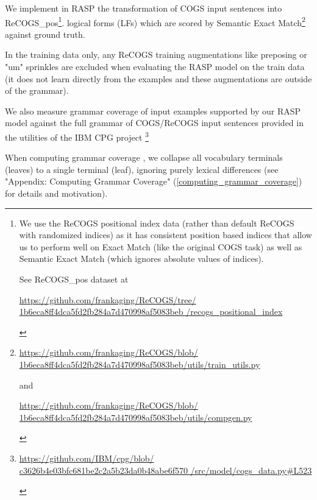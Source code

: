 \documentclass[11pt]{article}
\begin{document}
We implement in RASP the transformation of COGS input sentences into ReCOGS\_pos\footnote{
\begin{footnotesize}We use the ReCOGS positional index data (rather than default ReCOGS with randomized indices) as it has consistent position based indices that allow us to perform well on Exact Match (like the original COGS task) as well as Semantic Exact Match (which ignores absolute values of indices).

See ReCOGS\_pos dataset at 

\href{https://github.com/frankaging/ReCOGS/tree/1b6eca8ff4dca5fd2fb284a7d470998af5083beb/recogs\_positional\_index}{https://github.com/frankaging/ReCOGS/tree/
1b6eca8ff4dca5fd2fb284a7d470998af5083beb
/recogs\_positional\_index}
\end{footnotesize}
}. logical forms (LFs) which are scored by Semantic Exact Match\footnote{
\begin{footnotesize}\href{https://github.com/frankaging/ReCOGS/blob/1b6eca8ff4dca5fd2fb284a7d470998af5083beb/utils/train\_utils.py}{https://github.com/frankaging/ReCOGS/blob/
1b6eca8ff4dca5fd2fb284a7d470998af5083beb/utils/train\_utils.py}

and

\href{https://github.com/frankaging/ReCOGS/blob/1b6eca8ff4dca5fd2fb284a7d470998af5083beb/utils/compgen.py}{https://github.com/frankaging/ReCOGS/blob/
1b6eca8ff4dca5fd2fb284a7d470998af5083beb/utils/compgen.py}
\end{footnotesize}
} against ground truth.

In the training data only, any ReCOGS training augmentations like preposing or "um" sprinkles are excluded when evaluating the RASP model on the train data (it does not learn directly from the examples and these augmentations are outside of the grammar). 

We also measure grammar coverage of input examples supported by our RASP model against the full grammar of COGS/ReCOGS input sentences provided in the utilities of the IBM CPG project \citep{klinger2024compositionalprogramgenerationfewshot}\footnote{\begin{footnotesize}\href{https://github.com/IBM/cpg/blob/c3626b4e03bfc681be2c2a5b23da0b48abe6f570/src/model/cogs\_data.py\#L523}{https://github.com/IBM/cpg/blob/
c3626b4e03bfc681be2c2a5b23da0b48abe6f570
/src/model/cogs\_data.py\#L523}
\end{footnotesize}
}

When computing grammar coverage \citep{fuzzingbook2023:GrammarCoverageFuzzer}, we collapse all vocabulary terminals (leaves) to a single terminal (leaf), ignoring purely lexical differences (see "Appendix: Computing Grammar Coverage" (\ref{computing_grammar_coverage}) for details and motivation).
\end{document}
